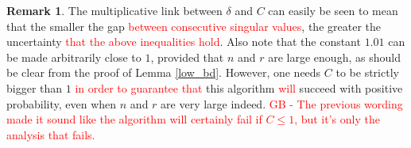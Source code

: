 \documentclass{article}
\newcommand{\red}[1]{\textcolor{red}{#1}}
\theoremstyle{definition}
\newtheorem{remark}[theorem]{Remark}
\begin{document}

\begin{remark} The multiplicative link between $\delta$ and $C$ can easily be seen to mean that the smaller the gap \red{between consecutive singular values}, the greater the uncertainty \red{that the above inequalities hold}. Also note that the constant $1.01$ can be made arbitrarily close to $1$, provided that $n$ and $r$ are large enough, as should be clear from the proof of Lemma \ref{low_bd}.
However, one needs $C$ to be strictly bigger than $1$ \red{in order to guarantee that} this algorithm \red{will} succeed with positive probability, even when $n$ and $r$ are very large indeed.  \red{GB - The previous wording made it sound like the algorithm will certainly fail if $C\leq 1$, but it's only the analysis that fails.}
\end{remark}
\end{document}
